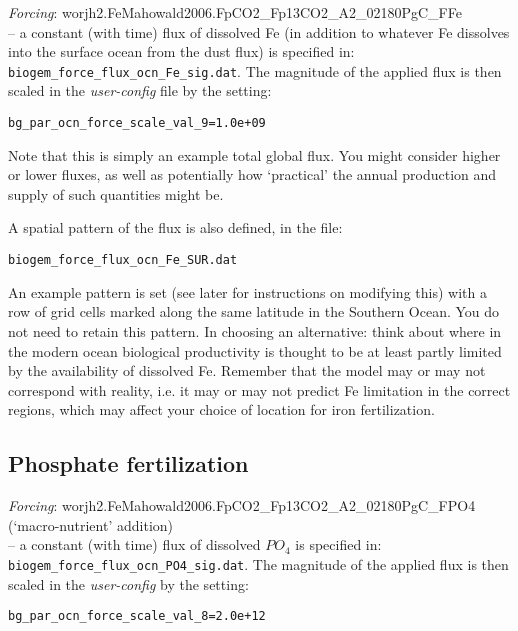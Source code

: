 \vspace{2mm}
\textit{Forcing}: \textsf{\footnotesize worjh2.FeMahowald2006.FpCO2\_Fp13CO2\_A2\_02180PgC\_FFe} \vspace{1mm}
\\-- a constant (with time) flux of dissolved Fe (in addition to whatever Fe dissolves into the surface ocean from the dust flux) is specified in: \texttt{biogem\_force\_flux\_ocn\_Fe\_sig.dat}. The magnitude of the applied flux is then scaled in the \textit{user-config} file by the setting:
\vspace{-1mm}
\small\begin{verbatim}
bg_par_ocn_force_scale_val_9=1.0e+09
\end{verbatim}\normalsize
\vspace{-1mm}
Note that this is simply an example total global flux. You might consider higher or lower fluxes, as well as potentially how ‘practical’ the annual production and supply of such quantities might be.

\vspace{1mm}
A spatial pattern of the flux is also defined, in the file:
\vspace{-1mm}
\small\begin{verbatim}
biogem_force_flux_ocn_Fe_SUR.dat
\end{verbatim}\normalsize
\vspace{-1mm}

An example pattern is set (see later for instructions on modifying this) with a row of grid cells  marked along the same latitude in the Southern Ocean. You do not need to retain this pattern. In choosing an alternative: think about where in the modern ocean biological productivity is thought to be at least partly limited by the availability of dissolved Fe. Remember that the model may or may not correspond with reality, i.e. it may or may not predict Fe limitation in the correct regions, which may affect your choice of location for iron fertilization.


\subsection{Phosphate fertilization}

\vspace{2mm}
\textit{Forcing}: \textsf{\footnotesize worjh2.FeMahowald2006.FpCO2\_Fp13CO2\_A2\_02180PgC\_FPO4} (‘macro-nutrient’ addition)
\vspace{1mm}
\\ -- a constant (with time) flux of dissolved \(PO_{4}\) is specified in: \texttt{biogem\_force\_flux\_ocn\_PO4\_sig.dat}. The magnitude of the applied flux is then scaled in the \textit{user-config} by the setting:
\vspace{-2mm}\small\begin{verbatim}
bg_par_ocn_force_scale_val_8=2.0e+12
\end{verbatim}\normalsize\vspace{-2mm}

